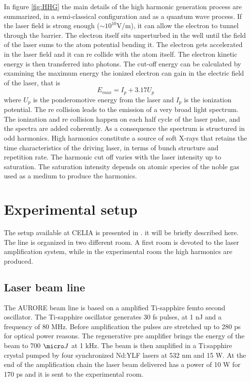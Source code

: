 In figure \ref{fig:HHG} the main details of the high harmonic generation process are summarized, in a semi-classical configuration and as a quantum wave process.
If the laser field is strong enough ($\sim 10^{10}$V/m), it can allow the electron to tunnel through the barrier. The electron itself sits unperturbed in the well until the field of the laser sums to the atom potential bending it.
The electron gets accelerated in the laser field and it can re collide with the atom itself. The electron kinetic energy is then transferred into photons.
The cut-off energy can be calculated by examining the maximum energy the ionized electron can gain in the electric field of the laser, that is
\begin{equation}
E_{max} = I_{p}+3.17U_{p}
\end{equation}
where $U_{p}$ is the ponderomotive energy from the laser and $I_{p}$ is the ionization potential. The re collision leads to the emission of a very broad light spectrum.
The ionization and re collision happen on each half cycle of the laser pulse, and the spectra are added coherently. As a consequence the spectrum is structured in odd harmonics.
High harmonics constitute a source of soft X-rays that retains the time characteristics of the driving laser, in terms of bunch structure and repetition rate. 
The harmonic cut off varies with the laser intensity up to saturation. The saturation intensity depends on atomic species of the noble gas used as a medium to produce the harmonics.

\section{Experimental setup}
The setup available at CELIA is presented in \cite{Martin2001}. it will be briefly described here. The line is organized in two different room. A first room is devoted to the laser amplification system, while in the experimental room the high harmonics are produced.
\subsection{Laser beam line}
The AURORE beam line is based on a amplified Ti-sapphire femto second oscillator. 
The Ti-sapphire oscillator generates 30 fs pulses, at 1 nJ and a frequency of 80 MHz. Before amplification the pulses are stretched up to 280 ps for optical power reasons.
The regenerative pre amplifier brings the energy of the beam to 700 $\micro J$ at 1 kHz.
The beam is then amplified in a Ti:sapphire crystal pumped by four synchronized Nd:YLF lasers at 532 nm and 15 W.
At the end of the amplification chain the laser beam delivered has a power of 10 W for 170 ps and it is sent to the experimental room.
